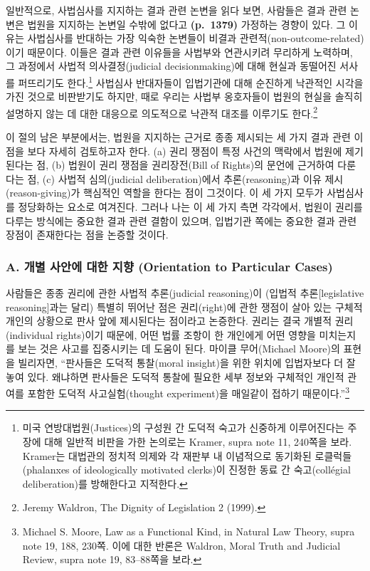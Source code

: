 \documentclass[a4paper,12pt,oneside]{article}  %
\begin{document}
일반적으로, 사법심사를 지지하는 결과 관련 논변을 읽다 보면, 사람들은
결과 관련 논변은 법원을 지지하는 논변일 수밖에 없다고 \textbf{(p.~1379)}
가정하는 경향이 있다. 그 이유는 사법심사를 반대하는 가장 익숙한 논변들이
비결과 관련적(non-outcome-related)이기 때문이다. 이들은 결과 관련
이유들을 사법부와 연관시키려 무리하게 노력하며, 그 과정에서 사법적
의사결정(judicial decisionmaking)에 대해 현실과 동떨어진 서사를
퍼뜨리기도 한다.\footnote{미국 연방대법원(Justices)의 구성원 간 도덕적
  숙고가 신중하게 이루어진다는 주장에 대해 일반적 비판을 가한 논의로는
  Kramer, supra note 11, 240쪽을 보라. Kramer는 대법관의 정치적 의제와
  각 재판부 내 이념적으로 동기화된 로클럭들(phalanxes of ideologically
  motivated clerks)이 진정한 동료 간 숙고(collégial deliberation)를
  방해한다고 지적한다.} 사법심사 반대자들이 입법기관에 대해 순진하게
낙관적인 시각을 가진 것으로 비판받기도 하지만, 때로 우리는 사법부
옹호자들이 법원의 현실을 솔직히 설명하지 않는 데 대한 대응으로
의도적으로 낙관적 대조를 이루기도 한다.\footnote{Jeremy Waldron, The
  Dignity of Legislation 2 (1999).}

이 절의 남은 부분에서는, 법원을 지지하는 근거로 종종 제시되는 세 가지
결과 관련 이점을 보다 자세히 검토하고자 한다. (a) 권리 쟁점이 특정
사건의 맥락에서 법원에 제기된다는 점, (b) 법원이 권리 쟁점을
권리장전(Bill of Rights)의 문언에 근거하여 다룬다는 점, (c) 사법적
심의(judicial deliberation)에서 추론(reasoning)과 이유
제시(reason-giving)가 핵심적인 역할을 한다는 점이 그것이다. 이 세 가지
모두가 사법심사를 정당화하는 요소로 여겨진다. 그러나 나는 이 세 가지
측면 각각에서, 법원이 권리를 다루는 방식에는 중요한 결과 관련 결함이
있으며, 입법기관 쪽에는 중요한 결과 관련 장점이 존재한다는 점을 논증할
것이다.

\subsubsection{A. 개별 사안에 대한 지향 (Orientation to Particular
Cases)}\label{a.-uxac1cuxbcc4-uxc0acuxc548uxc5d0-uxb300uxd55c-uxc9c0uxd5a5-orientation-to-particular-cases}

사람들은 종종 권리에 관한 사법적 추론(judicial reasoning)이 (입법적
추론{[}legislative reasoning{]}과는 달리) 특별히 뛰어난 점은
권리(right)에 관한 쟁점이 살아 있는 구체적 개인의 상황으로 판사 앞에
제시된다는 점이라고 논증한다. 권리는 결국 개별적 권리(individual
rights)이기 때문에, 어떤 법률 조항이 한 개인에게 어떤 영향을 미치는지를
보는 것은 사고를 집중시키는 데 도움이 된다. 마이클 무어(Michael Moore)의
표현을 빌리자면, ``판사들은 도덕적 통찰(moral insight)을 위한 위치에
입법자보다 더 잘 놓여 있다. 왜냐하면 판사들은 도덕적 통찰에 필요한 세부
정보와 구체적인 개인적 관여를 포함한 도덕적 사고실험(thought
experiment)을 매일같이 접하기 때문이다.''\footnote{Michael S. Moore, Law
  as a Functional Kind, in Natural Law Theory, supra note 19, 188,
  230쪽. 이에 대한 반론은 Waldron, Moral Truth and Judicial Review,
  supra note 19, 83--88쪽을 보라.}
\end{document}

